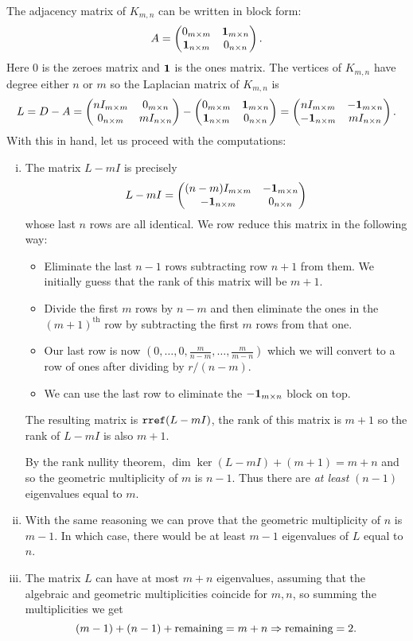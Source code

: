 \documentclass[12pt]{memoir}
\begin{document}
\begin{ptcbr}
    The adjacency matrix of $K_{m,n}$ can be written in block form:
    $$A=\begin{pmatrix} 0_{m\times m} & \mathbf{1}_{m\times n} \\ \mathbf{1}_{n\times m} & 0_{n\times n} \end{pmatrix}.$$
    Here $0$ is the zeroes matrix and $\mathbf{1}$ is the ones matrix. The vertices of $K_{m,n}$ have degree either $n$ or $m$ so the Laplacian matrix of $K_{m,n}$ is
    $$L=D-A=\begin{pmatrix} nI_{m\times m} & 0_{m\times n} \\ 0_{n\times m} & mI_{n\times n} \end{pmatrix}-\begin{pmatrix} 0_{m\times m} & \mathbf{1}_{m\times n} \\ \mathbf{1}_{n\times m} & 0_{n\times n} \end{pmatrix}=\begin{pmatrix} nI_{m\times m} & -\mathbf{1}_{m\times n} \\ -\mathbf{1}_{n\times m} & mI_{n\times n} \end{pmatrix}.$$
    With this in hand, let us proceed with the computations:
    \begin{enumerate}[i)]
        \itemsep=-0.4em
        \item The matrix $L-mI$ is precisely 
        $$L-mI=\begin{pmatrix} (n-m)I_{m\times m} & -\mathbf{1}_{m\times n} \\ -\mathbf{1}_{n\times m} & 0_{n\times n} \end{pmatrix}$$
        whose last $n$ rows are all identical. We row reduce this matrix in the following way: 
        \begin{itemize}
            \itemsep=-0.4em
            \item Eliminate the last $n-1$ rows subtracting row $n+1$ from them. We initially guess that the rank of this matrix will be $m+1$.
            \item Divide the first $m$ rows by $n-m$ and then eliminate the ones in the $(m+1)^{\text{th}}$ row by subtracting the first $m$ rows from that one. 
            \item Our last row is now $(0,\dots,0,\frac{m}{n-m},\dots,\frac{m}{m-n})$ which we will convert to a row of ones after dividing by $r/(n-m)$. 
            \item We can use the last row to eliminate the $-\mathbf{1}_{m\times n}$ block on top. 
        \end{itemize}
        The resulting matrix is $\texttt{rref}(L-mI)$, the rank of this matrix is $m+1$ so the rank of $L-mI$ is also $m+1$.\par 
        By the rank nullity theorem, $\dim\ker(L-mI)+(m+1)=m+n$ and so the geometric multiplicity of $m$ is $n-1$. Thus there are \emph{at least} $(n-1)$ eigenvalues equal to $m$.
        \item With the same reasoning we can prove that the geometric multiplicity of $n$ is $m-1$. In which case, there would be at least $m-1$ eigenvalues of $L$ equal to $n$.
        \item The matrix $L$ can have at most $m+n$ eigenvalues, assuming that the algebraic and geometric multiplicities coincide for $m,n$, so summing the multiplicities we get 
        $$(m-1)+(n-1)+\text{remaining}=m+n\Rightarrow \text{remaining}=2.$$
    \end{enumerate}
\end{ptcbr}
\end{document}
